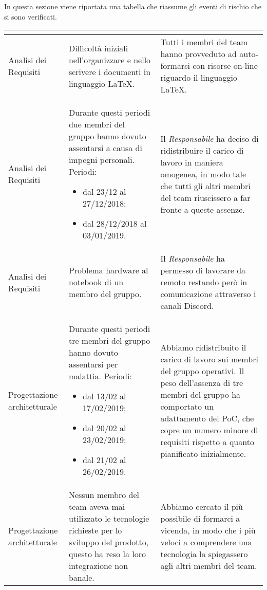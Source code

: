 In questa sezione viene riportata una tabella che riassume gli eventi di rischio che si sono verificati.
\vspace{1cm}
\renewcommand{\arraystretch}{1.5}
\begin{longtable}{| L{7em} | L{15em} | L{16em} |}
\hline
{}
\textbf{\color{title_text}{Periodo}}  & \textbf{\color{title_text}{Evento}} & \textbf{\color{title_text}{Reazione}} \\
\endhead
\hline
Analisi dei Requisiti & Difficoltà iniziali nell'organizzare e nello scrivere i documenti in linguaggio \LaTeX. & Tutti i membri del team hanno provveduto ad auto-formarsi con risorse on-line riguardo il linguaggio \LaTeX. \\
\hline

Analisi dei Requisiti & Durante questi periodi due membri del gruppo hanno dovuto assentarsi a causa di impegni personali. Periodi:
\begin{itemize}
	\item dal 23/12 al 27/12/2018;
	\item dal 28/12/2018 al 03/01/2019.
\end{itemize} & Il \emph{Responsabile} ha deciso di ridistribuire il carico di lavoro in maniera omogenea, in modo tale che tutti gli altri membri del team riuscissero a far fronte a queste assenze. \\
\hline

Analisi dei Requisiti & Problema hardware al notebook di un membro del gruppo. &  Il \emph{Responsabile} ha permesso di lavorare da remoto restando però in comunicazione attraverso i canali Discord.\\
\hline

Progettazione architetturale & Durante questi periodi tre membri del gruppo hanno dovuto assentarsi per malattia. Periodi:\begin{itemize}
    \item dal 13/02 al 17/02/2019;
    \item dal 20/02 al 23/02/2019;
    \item dal 21/02 al 26/02/2019.
\end{itemize} & Abbiamo ridistribuito il carico di lavoro sui membri del gruppo operativi.
Il peso dell'assenza di tre membri del gruppo ha comportato un adattamento del PoC, che copre un numero minore di requisiti rispetto a quanto pianificato inizialmente. \\
\hline

Progettazione architetturale & Nessun membro del team aveva mai utilizzato le tecnologie richieste per lo sviluppo del prodotto, questo ha reso la loro integrazione non banale. & Abbiamo cercato il più possibile di formarci a vicenda, in modo che i più veloci a comprendere una tecnologia la spiegassero agli altri membri del team. \\
\hline


\end{longtable}
